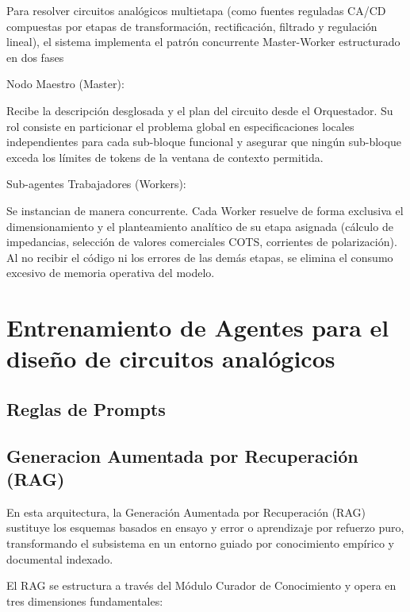 
Para resolver circuitos analógicos multietapa (como fuentes reguladas CA/CD compuestas por etapas de transformación, rectificación, filtrado y regulación lineal), el sistema implementa el patrón concurrente Master-Worker estructurado en dos fases

Nodo Maestro (Master):

Recibe la descripción desglosada y el plan del circuito desde el Orquestador. Su rol consiste en particionar el problema global en especificaciones locales independientes para cada sub-bloque funcional y asegurar que ningún sub-bloque exceda los límites de tokens de la ventana de contexto permitida.

Sub-agentes Trabajadores (Workers):

Se instancian de manera concurrente. Cada Worker resuelve de forma exclusiva el dimensionamiento y el planteamiento analítico de su etapa asignada (cálculo de impedancias, selección de valores comerciales COTS, corrientes de polarización). Al no recibir el código ni los errores de las demás etapas, se elimina el consumo excesivo de memoria operativa del modelo.

\section{Entrenamiento de Agentes para el diseño de circuitos analógicos}

\subsection{Reglas de Prompts}

\subsection{Generacion Aumentada por Recuperación (RAG)}

En esta arquitectura, la Generación Aumentada por Recuperación (RAG) sustituye los esquemas basados en ensayo y error o aprendizaje por refuerzo puro, transformando el subsistema en un entorno guiado por conocimiento empírico y documental indexado.

El RAG se estructura a través del Módulo Curador de Conocimiento y opera en tres dimensiones fundamentales:

